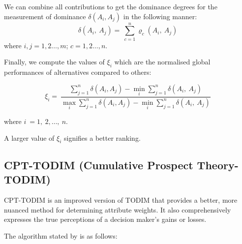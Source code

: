 \documentclass{infor}
\theoremstyle{remark}
\begin{document}
\begin{steps}
We can combine all contributions to get the dominance degrees for the measurement of dominance \(\delta\left(A_{i},A_{j} \right)\) in the following manner:
\begin{equation}\label{eqn:deltaSums}
\delta\left( A_{i},\ A_{j} \right) = \ \sum_{c = 1}^{n}{\varrho_{c}\left( A_{i},\ A_{j} \right)}
\end{equation}
where \(i,j  = 1, 2\ldots, m\); \(c = 1, 2\ldots, n\).

\item Finally, we compute the values of \(\xi_{i}\) which are the normalised global performances of
alternatives compared to others:

\begin{equation}\label{eqn:xiValues}
\xi_{i} = \ \frac{\sum_{j = 1}^{n}{\delta\left( A_{i},A_{j} \right) - \min_{i}{\sum_{j = 1}^{n}{\delta\left( A_{i},\ A_{j} \right)}}}}{\max_{i}{\sum_{j = 1}^{n}{\delta\left( A_{i},A_{j} \right) - \min_{i}{\sum_{j = 1}^{n}{\delta\left( A_{i},\ A_{j} \right)}}}}}
\end{equation}

where \(i\  = 1,\ 2,\ldots,\ n\).

A larger value of \(\xi_{i}\) signifies a better ranking.

\end{steps}

\subsection{ CPT-TODIM (Cumulative Prospect Theory-TODIM)}

CPT-TODIM is an improved version of TODIM that provides a better, more nuanced method for determining attribute weights. It also comprehensively expresses the true perceptions of a decision maker’s gains or losses.

The algorithm stated by \cite{tian2019extended} is as follows:
\end{document}
